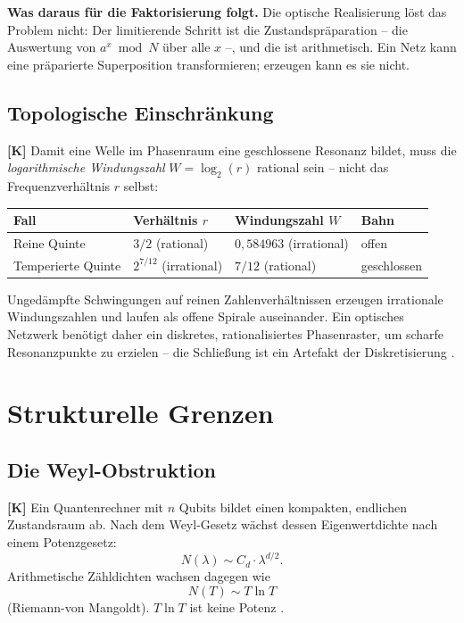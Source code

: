 \textbf{Was daraus für die Faktorisierung folgt.} Die optische
Realisierung löst das Problem nicht: Der limitierende Schritt ist die
Zustandspräparation -- die Auswertung von $a^x \bmod N$ über alle $x$ --,
und die ist arithmetisch. Ein Netz kann eine präparierte Superposition
transformieren; erzeugen kann es sie nicht.

\subsection{Topologische Einschränkung}

\textbf{[K]} Damit eine Welle im Phasenraum eine geschlossene Resonanz bildet,
muss die \emph{logarithmische Windungszahl} $W = \log_2(r)$ rational sein --
nicht das Frequenzverhältnis $r$ selbst:

\begin{center}
\begin{tabular}{llll}
\toprule
Fall & Verhältnis $r$ & Windungszahl $W$ & Bahn \\
\midrule
Reine Quinte & $3/2$ (rational) & $0{,}584963$ (irrational) & offen \\
Temperierte Quinte & $2^{7/12}$ (irrational) & $7/12$ (rational) & geschlossen \\
\bottomrule
\end{tabular}
\end{center}

Ungedämpfte Schwingungen auf reinen Zahlenverhältnissen erzeugen irrationale
Windungszahlen und laufen als offene Spirale auseinander. Ein optisches
Netzwerk benötigt daher ein diskretes, rationalisiertes Phasenraster, um
scharfe Resonanzpunkte zu erzielen -- die Schließung ist ein Artefakt der
Diskretisierung \cite{Dok316}.

\section{Strukturelle Grenzen}

\subsection{Die Weyl-Obstruktion}

\textbf{[K]} Ein Quantenrechner mit $n$ Qubits bildet einen kompakten,
endlichen Zustandsraum ab. Nach dem Weyl-Gesetz wächst dessen Eigenwertdichte
nach einem Potenzgesetz:
\begin{equation}
  N(\lambda) \sim C_d \cdot \lambda^{d/2}.
\end{equation}
Arithmetische Zähldichten wachsen dagegen wie
\begin{equation}
  N(T) \sim T\ln T
\end{equation}
(Riemann-von Mangoldt). $T\ln T$ ist keine Potenz \cite{Dok316}.

